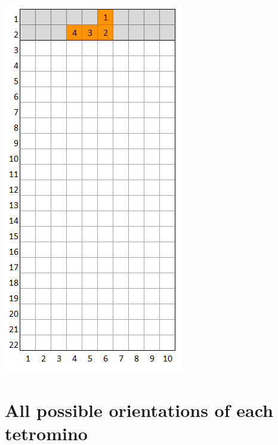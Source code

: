 \documentclass[a4paper]{article}
\begin{document}
	\begin{minipage}{0.26\textwidth}
		\centering
		\includegraphics[scale=0.4]{resources/img/minos/mino_orange}
		\label{fig:mino-orange}
	\end{minipage}%


\section{All possible orientations of each tetromino}
	
\end{document}
